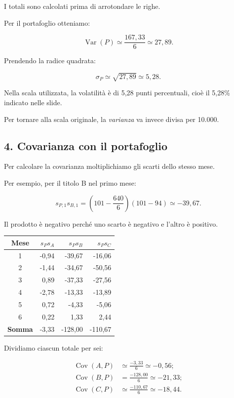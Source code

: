 \noindent I totali sono calcolati
prima di arrotondare le righe.

\noindent Per il portafoglio otteniamo:

\[
\operatorname{Var}(P)
\simeq\frac{167{,}33}{6}
\simeq
\boxed{27{,}89}.
\]

\noindent Prendendo la radice quadrata:

\[
\sigma_P\simeq\sqrt{27{,}89}
\simeq
\boxed{5{,}28}.
\]

\noindent Nella scala utilizzata,
la volatilità è di 5,28 punti percentuali,
cioè il 5,28\% indicato nelle slide.

\noindent Per tornare alla scala originale,
la \emph{varianza} va invece divisa per 10.000.


\subsection*{4. Covarianza con il portafoglio}

\noindent Per calcolare la covarianza
moltiplichiamo gli scarti
dello stesso mese.

\noindent Per esempio,
per il titolo B nel primo mese:

\[
s_{P,1}s_{B,1}
=
\left(101-\frac{640}{6}\right)
(101-94)
\simeq-39{,}67.
\]

\noindent Il prodotto è negativo
perché uno scarto è negativo
e l'altro è positivo.

\begin{center}
    \begin{tabular}{|c|r|r|r|}
        \hline
        \textbf{Mese}
        & $s_Ps_A$
        & $s_Ps_B$
        & $s_Ps_C$ \\
        \hline
        1 & -0,94 & -39,67 & -16,06 \\
        2 & -1,44 & -34,67 & -50,56 \\
        3 & 0,89 & -37,33 & -27,56 \\
        4 & -2,78 & -13,33 & -13,89 \\
        5 & 0,72 & -4,33 & -5,06 \\
        6 & 0,22 & 1,33 & 2,44 \\
        \hline
        \textbf{Somma} & -3,33 & -128,00 & -110,67 \\
        \hline
    \end{tabular}
\end{center}

\noindent Dividiamo ciascun totale per sei:

\[
\begin{aligned}
\operatorname{Cov}(A,P)
&\simeq\frac{-3{,}33}{6}
\simeq\boxed{-0{,}56};\\
\operatorname{Cov}(B,P)
&=\frac{-128{,}00}{6}
\simeq\boxed{-21{,}33};\\
\operatorname{Cov}(C,P)
&\simeq\frac{-110{,}67}{6}
\simeq\boxed{-18{,}44}.
\end{aligned}
\]

